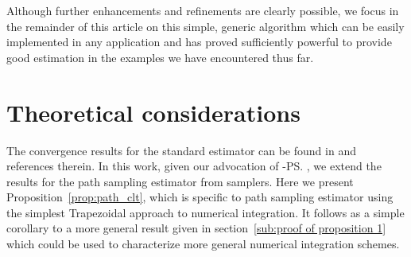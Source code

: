 Although further enhancements and refinements are clearly possible, we focus
in the remainder of this article on this simple, generic algorithm which can
be easily implemented in any application and has proved sufficiently powerful
to provide good estimation in the examples we have encountered thus far.

\section{Theoretical considerations}
\label{sec:Theoretical considerations}

The convergence results for the standard estimator can be found in
\cite{DelMoral:2006hc} and references therein. In this work, given our
advocation of \smc[2]-\ps, we extend the results for the path sampling
estimator from \smc samplers. Here we present Proposition~\ref{prop:path_clt},
which is specific to path sampling estimator using the simplest Trapezoidal
approach to numerical integration. It follows as a simple corollary to a more
general result given in section~\ref{sub:proof of proposition 1} which could
be used to characterize more general numerical integration schemes.


